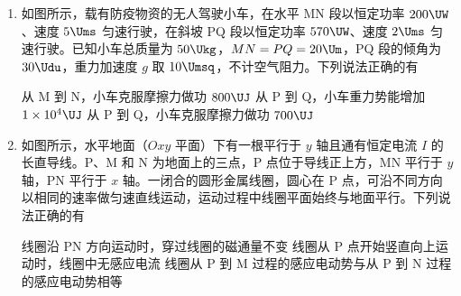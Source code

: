 \documentclass[\gkver]{gaokaozhenti}
\begin{document}
\begin{enumerate}
{故选 BC。
}

\item
如图所示，载有防疫物资的无人驾驶小车，在水平 MN 段以恒定功率 $200\UW$、速度 $5\Ums$ 匀速行驶，在斜坡 PQ 段以恒定功率 $570\UW$、速度 $2\Ums$ 匀速行驶。已知小车总质量为 $50\Ukg$，$MN = PQ = 20\Um$，PQ 段的倾角为 $30\Udu$，重力加速度 $g$ 取 $10\Umsq$，不计空气阻力。下列说法正确的有


{从 M 到 N，小车克服摩擦力做功 $800\UJ$}
{从 P 到 Q，小车重力势能增加 $1\times10^{4}\UJ$}
{从 P 到 Q，小车克服摩擦力做功 $700\UJ$}


\item
如图所示，水平地面（$Oxy$ 平面）下有一根平行于 $y$ 轴且通有恒定电流 $I$ 的长直导线。P、M 和 N 为地面上的三点，P 点位于导线正上方，MN 平行于 $y$ 轴，PN 平行于 $x$ 轴。一闭合的圆形金属线圈，圆心在 P 点，可沿不同方向以相同的速率做匀速直线运动，运动过程中线圈平面始终与地面平行。下列说法正确的有


{线圈沿 PN 方向运动时，穿过线圈的磁通量不变}
{线圈从 P 点开始竖直向上运动时，线圈中无感应电流}
{线圈从 P 到 M 过程的感应电动势与从 P 到 N 过程的感应电动势相等}


\end{enumerate}
\end{document}
